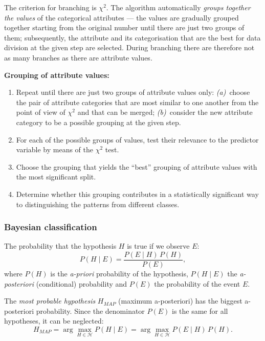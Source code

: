 \documentclass[11pt,a4paper]{article}
\theoremstyle{definition}
\providecommand{\uv}[1]{``#1''}
\begin{document}
\begin{defbox}
The criterion for branching is $\chi^2$. The algorithm automatically \emph{groups together the
values} of the categorical attributes --- the values are gradually grouped together starting from
the original number until there are just two groups of them; subsequently, the attribute and its
categorisation that are the best for data division at the given step are selected. During
branching there are therefore not as many branches as there are attribute values.

\textbf{Grouping of attribute values:}
\begin{enumerate}
\item Repeat until there are just two groups of attribute values only:
      \emph{(a)}~choose the pair of attribute categories that are most similar to one another from
      the point of view of $\chi^2$ and that can be merged; \emph{(b)}~consider the new attribute
      category to be a possible grouping at the given step.
\item For each of the possible groups of values, test their relevance to the predictor variable by
      means of the $\chi^2$ test.
\item Choose the grouping that yields the \uv{best} grouping of attribute values with the most
      significant split.
\item Determine whether this grouping contributes in a statistically significant way to
      distinguishing the patterns from different classes.
\end{enumerate}
\end{defbox}

\subsubsection{Bayesian classification}

\begin{defbox}
The probability that the hypothesis $H$ is true if we observe $E$:
\[ P(H\mid E)=\frac{P(E\mid H)\,P(H)}{P(E)}, \]
where $P(H)$ is the \emph{a-priori} probability of the hypothesis, $P(H\mid E)$ the
\emph{a-posteriori} (conditional) probability and $P(E)$ the probability of the event $E$.

The \emph{most probable hypothesis} $H_{MAP}$ (maximum a-posteriori) has the biggest a-posteriori
probability. Since the denominator $P(E)$ is the same for all hypotheses, it can be neglected:
\[ H_{MAP}=\arg\max_{H\in\mathcal H} P(H\mid E)=\arg\max_{H\in\mathcal H} P(E\mid H)\,P(H). \]
\end{defbox}
\end{document}
